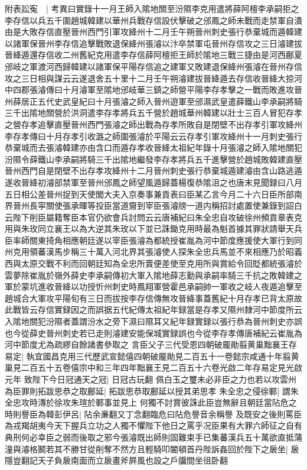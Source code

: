附表訟寃　|{
	考異曰實錄十一月王師入隂地關至汾隰李克用遣將薛阿檀李承嗣拒之李存信以兵五千圍趙城韓建以華州兵戰存信設伏擊破之邠鳳之師未戰而走禁軍自潰由是大敗存信直壓晉州西門引軍攻絳州十二月壬午朔晉州刺史張行恭棄城而遁韓建以諸軍保晉州李存信追擊戰敗退保絳州張濬以汴卒禁軍屯晉州存信攻之三日濬建拔晉絳遁還存信收二州舊紀克用遣李存信薛阿檀拒王師於隂地三戰三捷由是河西鄜夏邠岐之軍渡河西歸韓建以諸軍保平陽存信追之建軍又敗建退保絳州張濬在晉州存信攻之三日相與謀云云遂退舍五十里十二月壬午朔濬建拔晉絳遁去存信收晉絳大掠河中四郡張濬傳曰十月濬軍至隂地邠岐華三鎮之師營平陽李存孝擊之一戰而敗進攻晉州薛居正五代史武皇紀曰十月張濬之師入晉州遊軍至邠濕武皇遣薛鐵山李承嗣將騎三千出隂地關營於洪洞遣李存孝將兵五千營於趙城華州韓建以壯士三百人冒犯存孝之營存孝追擊直壓晉州西門張濬之師出戰為存孝所敗自是閉壁不出存孝引軍攻絳州李存孝傳曰十月存孝引收潞之師圍張濬於平陽云云存孝引軍攻絳州十一月刺史張行恭棄城而去張濬韓建亦由含口而遁存孝收晉絳太祖紀年錄十月張濬之師入隂地關犯汾隰令薛鐵山李承嗣將騎三千出隂地繼發李存孝將兵五千進擊營於趙城敗韓建直壓晉州西門自是閉壁不出存孝攻絳州十二月晉州刺史張行恭棄城遁建濬由含山路逃遁遂收晉絳初濬部禁軍至晉州邠鳳之師望風遁歸蓋楊復恭隂沮之也唐末見聞録曰八月五日相公差晉州捉到天使閭大夫入京奏事兼貢表曰臣某乙言今月二十六日臣所部南界晉州長寜關使張承暉等投臣當道齎到宰臣張濬牓一道内稱招討處置使兼錄到詔白云陛下削臣屬籍奪臣本官仍欲會兵討問云云唐補紀曰朱全忠自攻破徐州頻貢章表克用與朱玫同立襄王以為大逆其朱玫以下並已誅鋤克用時最為魁首據其罪狀請舉天兵臣率師關東掎角相應朝廷遂以宰臣張濬為都統授崔胤為河中節度應援使大軍行到同州克用領蕃漢馬步稱三十萬入河北界其張濬使人探朱全忠兵馬並不來相應乃於昭義西與太原交戰不利而回朝廷知為全忠所賣便差使至克用所與賞給令回貶都統張濬於雲夢除崔胤於嶺外薛史李承嗣傳初大軍入隂地薛志勤與承嗣率騎三千抗之敗韓建之軍於蒙坑進收晉絳以功授忻州刺史時鳳翔軍營霍邑承嗣帥一軍收之岐人夜遁追擊至趙城合大軍攻平陽旬有三日而拔按李存信傳無攻晉絳事蓋舊紀十月存孝已背太原故此戰皆云存信實録因之而誤据五代紀傳太祖紀年録當是存孝又隰州隸河中節度所云入隂地關犯汾隰者蓋謂汾水之旁下濕曰隰耳又紀年録實録以張行恭為晉州刺史亦誤也今從薛史晉州刺史若已走則濬建安能保城實録誤也今從李存孝傳唐補紀云崔胤為河中節度尤為疏繆自餘諸書參取之}
言臣父子三代受恩四朝破龎勛翦黄巢黜襄王存易定|{
	執宜國昌克用三代歷武宣懿僖四朝破龎勛見二百五十一卷懿宗咸通十年翦黄巢見二百五十五卷僖宗中和三年四年黜襄王見二百五十六卷光啟二年存易定見光啟元年}
致陛下今日冠通天之冠|{
	日冠古玩翻}
佩白玉之璽未必非臣之力也若以攻雲州為臣罪則拓跋思恭之取鄜延|{
	拓跋思恭取鄜延以授其弟思孝}
朱全忠之侵徐鄆|{
	謂朱全忠攻時漙於徐攻朱瑄於鄆事並見上}
何獨不討賞彼誅此臣豈無辭且朝廷當阽危之時則譽臣為韓彭伊呂|{
	阽余亷翻又丁念翻臨危曰阽危譽音余稱譽}
及既安之後則罵臣為戎羯胡夷今天下握兵立功之人獨不懼陛下他日之罵乎况臣果有大罪六師征之自有典刑何必幸臣之弱而後取之邪今張濬既出師則固難束手已集蕃漢兵五十萬欲直抵蒲潼與濬格鬭若其不勝甘從削奪不然方且輕騎叩閽頓首丹陛訴姦回於陛下之扆坐|{
	扆隱豈翻記天子負扆南面而立扆畫斧屛風也設之戶牖間坐徂卧翻}
